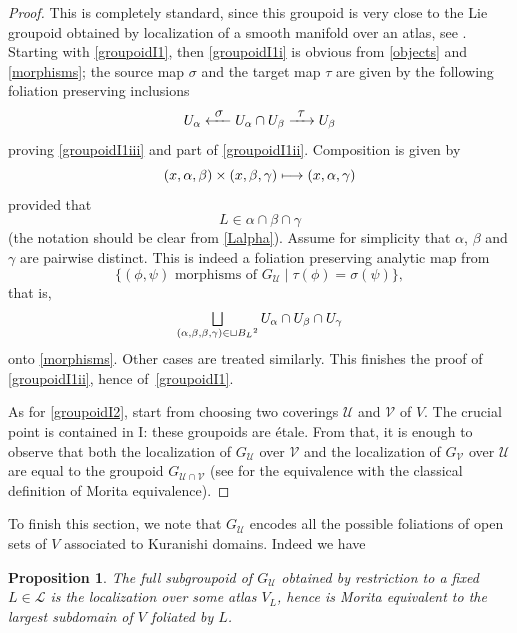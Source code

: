 \documentclass[10pt]{amsart}
\let\mathcal\mathscr
\let\oldbigsqcup\bigsqcup
\renewcommand{\bigsqcup}{\mathop{\textstyle\oldbigsqcup}\displaylimits}
\def\mto{\mathchoice{\longmapsto}{\mapsto}{\mapsto}{\mapsto}}
\def\To#1{\mathchoice{\xrightarrow{\textstyle\kern4pt#1\kern3pt}}{\stackrel{#1}{\longrightarrow}}{}{}}
\def\From#1{\mathchoice{\xleftarrow{\textstyle~#1~}}{\stackrel{#1}{\longleftarrow}}{}{}}
\theoremstyle{plain}
\newtheorem{proposition}[theorem]{Proposition}
\theoremstyle{definition}
\theoremstyle{remark}
\numberwithin{equation}{section}
\let\uniondisjointe\bigsqcup
\begin{document}
\begin{proof}
This is completely standard, since this groupoid is very close to the Lie groupoid obtained by localization of a smooth manifold over an atlas, see \cite[\S 7.1.3]{Ernesto}. Starting with \eqref{groupoidI1}, then \eqref{groupoidI1i} is obvious from \eqref{objects} and \eqref{morphisms}; the source map $\sigma$ and the target map $\tau$ are given by the following foliation preserving inclusions
\begin{equation}
\label{folinclusions}
U_{\alpha}\From{\sigma} U_{\alpha}\cap U_{\beta} \To{\tau}U_{\beta}
\end{equation}
proving \eqref{groupoidI1iii} and part of \eqref{groupoidI1ii}. Composition is given by
\begin{equation}
\label{composition}
(x,\alpha,\beta)\times (x,\beta,\gamma)\mto (x,\alpha,\gamma)
\end{equation}
provided that
\[
L\in\alpha\cap\beta\cap\gamma
\]
(the notation should be clear from \eqref{Lalpha}). Assume for simplicity that $\alpha$, $\beta$ and $\gamma$ are pairwise distinct.
This is indeed a foliation preserving analytic map from
\[
\{(\phi,\psi)\text{ morphisms of }G_{\mathcal U}\mid \tau (\phi)=\sigma (\psi)\},
\]
that is,
\begin{equation}
\label{compdomain}
\uniondisjointe_{(\alpha,\beta,\beta,\gamma)\in \sqcup {B_L}^2} U_{\alpha}\cap U_{\beta}\cap U_{\gamma}
\end{equation}
onto \eqref{morphisms}. Other cases are treated similarly. This finishes the proof of \eqref{groupoidI1ii}, hence of~\eqref{groupoidI1}.

As for \eqref{groupoidI2}, start from choosing two coverings $\mathcal U$ and $\mathcal V$ of $V$.
The crucial point is contained in I: these groupoids are étale. From that, it is enough to observe that both the localization of $G_{\mathcal U}$ over $\mathcal V$ and the localization of $G_{\mathcal V}$ over $\mathcal U$ are equal to the groupoid $G_{\mathcal U\cap \mathcal V}$ (see \cite{Ha} for the equivalence with the classical definition of Morita equivalence).
\end{proof}
To finish this section, we note that $G_{\mathcal U}$ encodes all the possible foliations of open sets of $V$ associated to Kuranishi domains. Indeed we have

\begin{proposition}
\label{full}
The full subgroupoid of $G_{\mathcal U}$ obtained by restriction to a fixed $L\in\mathcal L$ is the localization over some atlas $V_L$, hence is Morita equivalent to the largest subdomain of $V$ foliated by $L$.
\end{proposition}
\end{document}
